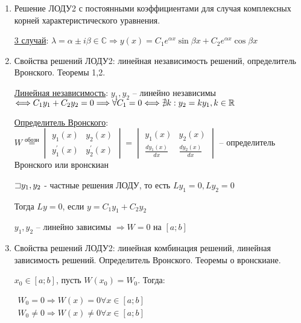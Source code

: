 \documentclass[12pt]{article}
\begin{document}
\begin{enumerate}
        \item Решение ЛОДУ2 с постоянными коэффициентами для случая комплексных корней характеристического уравнения.

        \hyperlink{ldesgcomplexsolutions}{3 случай}: $\lambda = \alpha \pm i \beta \in \mathbb{C} \Longrightarrow y(x) = C_1 e^{\alpha x} \sin \beta x + C_2 e^{\alpha x} \cos \beta x$


        \item Свойства решений ЛОДУ2: линейная независимость решений, определитель Вронского. Теоремы 1,2.

        \hyperlink{linearindependance}{Линейная независимость}: \Defs $y_1, y_2$ -- линейно независимы $\Longleftrightarrow C_1 y_1 + C_2 y_2 = 0 \Longrightarrow \forall C_1 = 0 \Longleftrightarrow \nexists k : y_2 = k y_1, k \in \mathbb{R}$
        
        \hyperlink{determinantWronski}{Определитель Вронского}: \Defs $W \stackrel{\text{обозн}}{=} \begin{vmatrix}y_1(x) & y_2(x) \\ y_1^\prime(x) & y_2^\prime(x)\end{vmatrix} = \begin{vmatrix}y_1(x) & y_2(x) \\ \frac{d y_1(x)}{dx} & \frac{d y_2(x)}{dx}\end{vmatrix}$ -- определитель Вронского или вронскиан

        \begin{MyTheorem}
             $\mathord{\sqsupset} y_1, y_2$ - частные решения ЛОДУ, то есть $Ly_1 = 0, Ly_2 = 0$

            Тогда $Ly = 0$, если $y = C_1 y_1 + C_2 y_2$
        \end{MyTheorem}

        \begin{MyTheorem}
             $y_1, y_2$ -- линейно зависимы $\Longrightarrow W = 0$ на $[a;b]$
        \end{MyTheorem}    

        \item Свойства решений ЛОДУ2: линейная комбинация решений, линейная зависимость решений. Определитель Вронского. Теоремы о вронскиане.

        \begin{MyTheorem}
             $x_0 \in [a;b]$, пусть $W(x_0) = W_0$. Тогда: 
            
            $\begin{matrix}W_0 = 0 \Longrightarrow W(x) = 0 \forall x \in [a;b] \\
            W_0 \neq 0 \Longrightarrow W(x) \neq 0 \forall x \in [a;b]\end{matrix}$
        \end{MyTheorem}


\end{enumerate}
\end{document}
